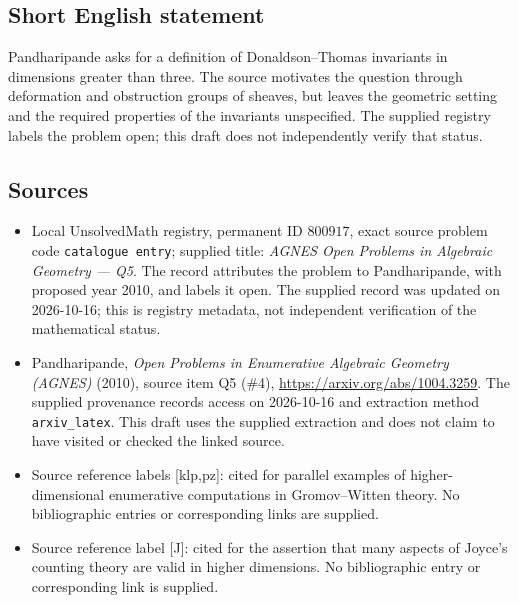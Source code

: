 \documentclass[11pt]{article}
\begin{document}
\subsection{Short English statement}
Pandharipande asks for a definition of Donaldson--Thomas invariants in dimensions greater than three. The source motivates the question through deformation and obstruction groups of sheaves, but leaves the geometric setting and the required properties of the invariants unspecified. The supplied registry labels the problem open; this draft does not independently verify that status.
\subsection{Sources}
\begin{itemize}
\item Local UnsolvedMath registry, permanent ID \(800917\), exact source problem code \texttt{catalogue entry}; supplied title: \emph{AGNES Open Problems in Algebraic Geometry --- Q5}. The record attributes the problem to Pandharipande, with proposed year 2010, and labels it open. The supplied record was updated on 2026-10-16; this is registry metadata, not independent verification of the mathematical status.
\item Pandharipande, \emph{Open Problems in Enumerative Algebraic Geometry (AGNES)} (2010), source item Q5 (\#4), \url{https://arxiv.org/abs/1004.3259}. The supplied provenance records access on 2026-10-16 and extraction method \texttt{arxiv\_latex}. This draft uses the supplied extraction and does not claim to have visited or checked the linked source.
\item Source reference labels [klp,pz]: cited for parallel examples of higher-dimensional enumerative computations in Gromov--Witten theory. No bibliographic entries or corresponding links are supplied.
\item Source reference label [J]: cited for the assertion that many aspects of Joyce's counting theory are valid in higher dimensions. No bibliographic entry or corresponding link is supplied.
\end{itemize}
\end{document}
